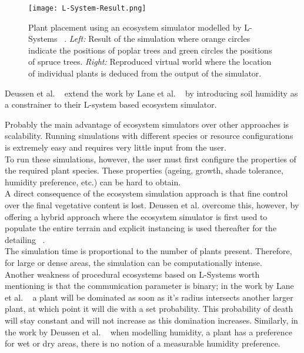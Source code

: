 \begin{figure}[h]
  \centering
    \label{Plant placement using an ecosystem simulator modelled by L-System}
    \texttt{[image: L-System-Result.png]}
    \caption[Plant placement using an ecosystem simulator modelled by L-Systems]{ Plant placement using an ecosystem simulator modelled by L-Systems ~\cite{Lane2002}. \textit{Left:} Result of the simulation where orange circles indicate the positions of poplar trees and green circles the positions of spruce trees. \textit{Right:} Reproduced virtual world where the location of individual plants is deduced from the output of the simulator.}
\end{figure}

Deussen et al. ~\cite{Deussen1998} extend the work by Lane et al. ~\cite{Lane2002} by introducing soil humidity as a constrainer to their L-system based ecosystem simulator.

Probably the main advantage of ecosystem simulators over other approaches is scalability. Running simulations with different species or resource configurations is extremely easy and requires very little input from the user. \\

To run these simulations, however, the user must first configure the properties of the required plant species. These properties (ageing, growth, shade tolerance, humidity preference, etc.) can be hard to obtain.\\
A direct consequence of the ecosystem simulation approach is that fine control over the final vegetative content is lost. Deussen et al. overcome this, however, by offering a hybrid approach where the ecosystem simulator is first used to populate the entire terrain and explicit instancing is used thereafter for the detailing ~\cite{Deussen1998}.\\
The simulation time is proportional to the number of plants present. Therefore, for large or dense areas, the simulation can be computationally intense. \\
Another weakness of procedural ecosystems based on L-Systems worth mentioning is that the communication parameter is binary; in the work by Lane et al. ~\cite{Lane2002} a plant will be dominated as soon as it’s radius intersects another larger plant, at which point it will die with a set probability. This probability of death will stay constant and will not increase as this domination increases. Similarly, in the work by Deussen et al. ~\cite{Deussen1998} when modelling humidity, a plant has a preference for wet or dry areas, there is no notion of a measurable humidity preference.

